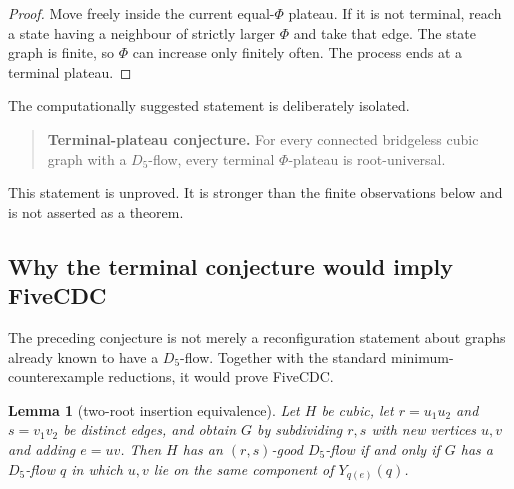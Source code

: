 \documentclass[11pt]{article}
\newtheorem{lemma}[theorem]{Lemma}
\theoremstyle{definition}
\theoremstyle{remark}
\begin{document}
\begin{proof}
Move freely inside the current equal-\(\Phi\) plateau.  If it is not
terminal, reach a state having a neighbour of strictly larger \(\Phi\)
and take that edge.  The state graph is finite, so \(\Phi\) can increase
only finitely often.  The process ends at a terminal plateau.
\end{proof}

The computationally suggested statement is deliberately isolated.

\begin{quote}
\textbf{Terminal-plateau conjecture.}
For every connected bridgeless cubic graph with a \(D_5\)-flow, every
terminal \(\Phi\)-plateau is root-universal.
\end{quote}

This statement is unproved.  It is stronger than the finite observations
below and is not asserted as a theorem.

\subsection{Why the terminal conjecture would imply FiveCDC}

The preceding conjecture is not merely a reconfiguration statement about
graphs already known to have a \(D_5\)-flow.  Together with the standard
minimum-counterexample reductions, it would prove FiveCDC.

\begin{lemma}[two-root insertion equivalence]\label{lem:two-root-insertion}
Let \(H\) be cubic, let \(r=u_1u_2\) and \(s=v_1v_2\) be distinct edges,
and obtain \(G\) by subdividing \(r,s\) with new vertices \(u,v\) and
adding \(e=uv\).  Then \(H\) has an \((r,s)\)-good \(D_5\)-flow if and
only if \(G\) has a \(D_5\)-flow \(q\) in which \(u,v\) lie on the same
component of \(Y_{q(e)}(q)\).
\end{lemma}
\end{document}
